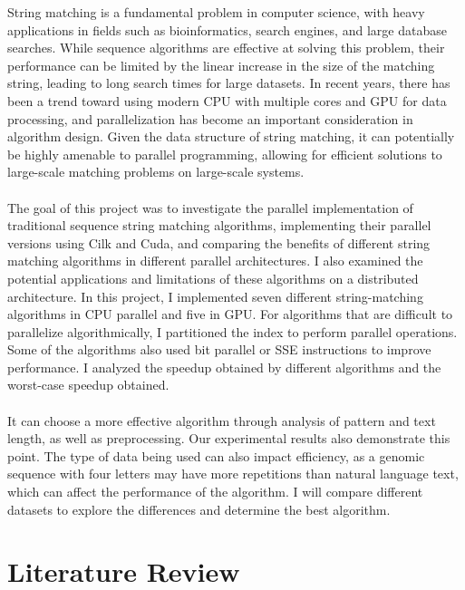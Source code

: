 \documentclass[11pt]{article}       %
\begin{document}
String matching is a fundamental problem in computer science, with heavy applications in fields such as bioinformatics, search engines, and large database searches. While sequence algorithms are effective at solving this problem, their performance can be limited by the linear increase in the size of the matching string, leading to long search times for large datasets. In recent years, there has been a trend toward using modern CPU with multiple cores and GPU for data processing, and parallelization has become an important consideration in algorithm design. Given the data structure of string matching, it can potentially be highly amenable to parallel programming, allowing for efficient solutions to large-scale matching problems on large-scale systems.\\
\\The goal of this project was to investigate the parallel implementation of traditional sequence string matching algorithms, implementing their parallel versions using Cilk and Cuda, and comparing the benefits of different string matching algorithms in different parallel architectures. I also examined the potential applications and limitations of these algorithms on a distributed architecture. In this project, I implemented seven different string-matching algorithms in CPU parallel and five in GPU. For algorithms that are difficult to parallelize algorithmically, I partitioned the index to perform parallel operations. Some of the algorithms also used bit parallel or SSE instructions to improve performance. I analyzed the speedup obtained by different algorithms and the worst-case speedup obtained.\\ 
\\It can choose a more effective algorithm through analysis of pattern and text length, as well as preprocessing. Our experimental results also demonstrate this point. The type of data being used can also impact efficiency, as a genomic sequence with four letters may have more repetitions than natural language text, which can affect the performance of the algorithm. I will compare different datasets to explore the differences and determine the best algorithm.\\

\section{Literature Review} \label{litrev}
\end{document}
